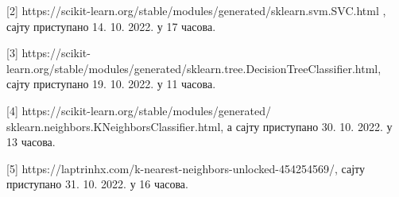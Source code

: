 \documentclass[11pt]{article} %
\begin{document}
[2] https://scikit-learn.org/stable/modules/generated/sklearn.svm.SVC.html , сајту приступано 14. 10. 2022. у 17 часова.

[3] https://scikit-learn.org/stable/modules/generated/sklearn.tree.DecisionTreeClassifier.html, сајту приступано 19. 10. 2022. у 11 часова.

[4] https://scikit-learn.org/stable/modules/generated/ sklearn.neighbors.KNeighborsClassifier.html, а сајту приступано 30. 10. 2022. у 13 часова.

[5] https://laptrinhx.com/k-nearest-neighbors-unlocked-454254569/, сајту приступано 31. 10. 2022. у 16 часова.
\end{document}
